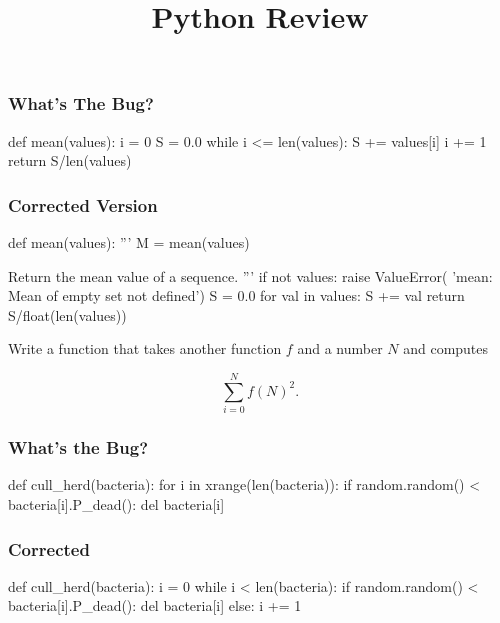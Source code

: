
\title{Python Review}

\frame{\maketitle}

\begin{frame}[fragile]
\frametitle{What's The Bug?}

\begin{python}
def mean(values):
    i = 0
    S = 0.0
    while i <= len(values):
        S += values[i]
        i += 1
    return S/len(values)
\end{python}
\end{frame}
\begin{frame}[fragile]
\frametitle{Corrected Version}

\begin{python}
def mean(values):
    '''
    M = mean(values)

    Return the mean value of a sequence.
    '''
    if not values:
        raise ValueError(
            'mean: Mean of empty set not defined')
    S = 0.0
    for val in values:
        S += val
    return S/float(len(values))
\end{python}
\end{frame}

\begin{frame}[fragile]
Write a function that takes another function $f$ and a number $N$ and computes

\begin{equation*}
\sum_{i=0}^{N} f(N)^2.
\end{equation*}

\end{frame}

\begin{frame}[fragile]
\frametitle{What's the Bug?}

\begin{python}
def cull_herd(bacteria):
    for i in xrange(len(bacteria)):
        if random.random() < bacteria[i].P_dead():
            del bacteria[i]
\end{python}
\end{frame}

\begin{frame}[fragile]
\frametitle{Corrected}
\begin{python}
def cull_herd(bacteria):
    i = 0
    while i < len(bacteria):
        if random.random() < bacteria[i].P_dead():
            del bacteria[i]
        else:
            i += 1
\end{python}
\end{frame}

